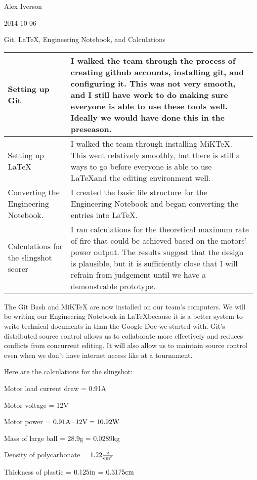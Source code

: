 Alex Iverson

2014-10-06

Git, \LaTeX, Engineering Notebook, and Calculations

\begin{tabular}{|p{5cm}|p{5cm}|}
 \hline
 Setting up Git
 &
 I walked the team through the process of creating github accounts, installing git, and configuring it. This was not very smooth, and I still have work to do making sure everyone is able to use these tools well. Ideally we would have done this in the preseason.
 \\
 \hline
 Setting up \LaTeX
 &
 I walked the team through installing MiKTeX. This went relatively smoothly, but there is still a ways to go before everyone is able to use \LaTeX and the editing environment well.
 \\
 \hline
 Converting the Engineering Notebook.
 &
 I created the basic file structure for the Engineering Notebook and began converting the entries into \LaTeX.
 \\
 \hline
 Calculations for the slingshot scorer
 &
 I ran calculations for the theoretical maximum rate of fire that could be achieved based on the motors' power output. The results suggest that the design is plausible, but it is sufficiently close that I will refrain from judgement until we have a demonstrable prototype.
 \\
 \hline
\end{tabular}

The Git Bash and MiKTeX are now installed on our team's computers. We will be writing our Engineering Notebook in \LaTeX because it is a better system to write technical documents in than the Google Doc we started with. Git's distributed source control allows us to collaborate more effectively and reduces conflicts from concurrent editing. It will also allow us to maintain source control even when we don't have internet access like at a tournament.

\medskip 

Here are the calculations for the slingshot:

Motor load current draw = 0.91A

Motor voltage = 12V

Motor power = $0.91\rm{A}\cdot12\rm{V} = 10.92\rm{W}$

Mass of large ball = 28.9g = 0.0289kg

Density of polycarbonate = $1.22\frac{\rm{g}}{\rm{cm}^3}$

Thickness of plastic = $0.125\rm{in}$ = $0.3175\rm{cm}$

